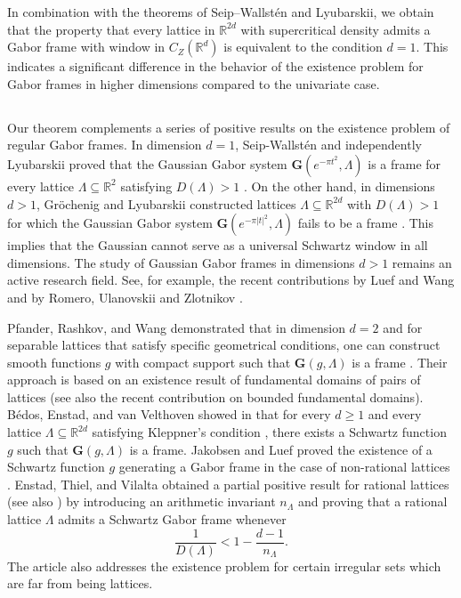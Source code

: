 \documentclass[reqno,a4paper,12pt]{amsart}
\numberwithin{equation}{section}
\def\R{{\mathbb R}}
\def\Q{{\mathbb Q}}
\newcommand\1{\mathds{1}}
\begin{document}
In combination with the theorems of Seip–Wallstén and Lyubarskii, we obtain that the property that every lattice in $\mathbb{R}^{2d}$ with supercritical density admits a Gabor frame with window in $C_Z(\mathbb{R}^d)$ is equivalent to the condition $d = 1$. This indicates a significant difference in the behavior of the existence problem for Gabor frames in higher dimensions compared to the univariate case.

\subsection{}\label{g}
Our theorem complements a series of positive results on the existence problem of regular Gabor frames. In dimension $d=1$, Seip-Wallstén and independently Lyubarskii proved that the Gaussian
Gabor system $\mathbf{G}(e^{-\pi t^2},\Lambda)$ is a frame for every lattice $\Lambda \subseteq \mathbb{R}^2$ satisfying $D(\Lambda)>1$ \cite{Seip1992,Seip+1992+91+106,lyubarskiiframes}. On the other hand, in dimensions $d > 1$, Gröchenig and Lyubarskii constructed lattices $\Lambda \subseteq \R^{2d}$ with $D(\Lambda) > 1$ for which the Gaussian Gabor system $\mathbf{G}(e^{-\pi |t|^2},\Lambda)$ fails to be a frame \cite{grochenig2020sampling}. This implies that the Gaussian cannot serve as a universal Schwartz window in all dimensions. The study of Gaussian Gabor frames in dimensions $d > 1$ remains an active research field. See, for example, the recent contributions by Luef and Wang \cite{luef2023gaussian} and by Romero, Ulanovskii and Zlotnikov \cite{romero2024sampling}. 

Pfander, Rashkov, and Wang demonstrated that in dimension $d = 2$ and for separable lattices that satisfy specific geometrical conditions, one can construct smooth functions $ g $ with compact support such that $\mathbf{G}(g,\Lambda)$ is a frame \cite{pfander2012geometric}. Their approach is based on an existence result of fundamental domains of pairs of lattices \cite{han2001lattice} (see also the recent contribution \cite{grepstad2026bounded} on bounded fundamental domains). 
B{\'e}dos, Enstad, and van Velthoven showed in \cite{bedos2022smooth} that for every $d 
\geq 1$ and every lattice $\Lambda \subseteq \R^{2d}$ satisfying Kleppner's condition \cite{Kleppner1962}, there exists a Schwartz function $g$ such that $\mathbf{G}(g,\Lambda)$ is a frame. Jakobsen and Luef proved the existence of a Schwartz function $g$ generating a Gabor frame in the case of non-rational lattices \cite{jakobsen2020duality}.
Enstad, Thiel, and Vilalta obtained a partial positive result for rational lattices \cite{enstad2025criteria} (see also \cite{enstad2026zstability}) by introducing an arithmetic invariant $n_\Lambda$ and proving that a rational lattice $\Lambda$ admits a Schwartz Gabor frame whenever
\begin{equation}\label{eq:nLambda_inequality}
    \frac{1}{D(\Lambda)} <1-\frac{d-1}{n_\Lambda}.
\end{equation}
The article \cite{liu2026full} also addresses the existence problem for certain irregular sets which are far from being lattices.
\end{document}
